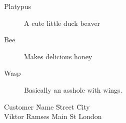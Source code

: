 \documentclass[a4paper,12pt,]{report}
\begin{document}
\bigskip

\begin{description}
\item[Platypus] A cute little duck beaver
\item[Bee] Makes delicious honey
\item[Wasp] Basically an asshole with wings.
\end{description}

\begin{tabbing}
Customer \= Name \hspace*{1.5cm}\= Street \hspace*{1.5cm} \=
City \\
\>Viktor Ramses  Main St \> London \\
\end{tabbing}
\end{document}
